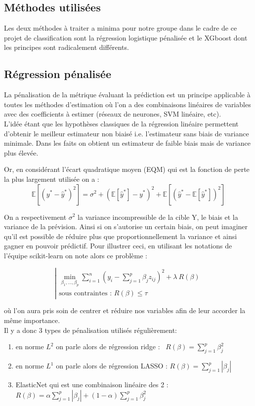 \documentclass[french]{article}
\begin{document}
\begin{multicols}{2}
\section{Méthodes utilisées}
Les deux méthodes à traiter a minima pour notre groupe dans le cadre de ce projet de classification sont la régression logistique pénalisée et le XGboost dont les principes sont radicalement différents.


\subsection{Régression pénalisée}
La pénalisation de la métrique évaluant la prédiction est un principe applicable à toutes les méthodes d'estimation où l’on a des combinaisons linéaires de variables avec des coefficients à estimer (réseaux de neurones, SVM linéaire, etc).\\
L'idée étant que les hypothèses classiques de la régression linéaire permettent d'obtenir le meilleur estimateur non biaisé i.e. l'estimateur sans biais de variance minimale. Dans les faits on obtient un estimateur de faible biais mais de variance plus élevée.

Or, en considérant l'écart quadratique moyen (EQM) qui est la fonction de perte la plus largement utilisée on a : 
\[\mathbb{E}\left[\left(y^{*}-\hat{y}^{*}\right)^{2}\right]=\sigma^{2}+\left(\mathbb{E}\left[\hat{y}^{*}\right]-y^{*}\right)^{2}+\mathbb{E}\left[\left(\hat{y}^{*}-\mathbb{E}\left[\hat{y}^{*}\right]\right)^{2}\right] \]

On a respectivement $\sigma^{2}$ la variance incompressible de la cible Y, le biais et la variance de la prévision. Ainsi si on s'autorise un certain biais, on peut imaginer qu'il est possible de réduire plus que proportionnellement la variance et ainsi gagner en pouvoir prédictif. Pour illustrer ceci, en utilisant les notations de l'équipe scikit-learn on note alors ce problème : 

\[ \left| \begin{array}{l}\displaystyle\min_{\beta_1, \dots, \beta_p} \sum_{i=1}^{n} \left( y_i - \sum_{j=1}^{p}\beta_j z_{ij} \right)^2 + \lambda \ R(\beta) \\
\text{sous contraintes : } R (\beta) \leq \tau \end{array} \right.\]


où l'on aura pris soin de centrer et réduire nos variables afin de leur accorder la même importance.
\\

Il y a donc 3 types de pénalisation utilisés régulièrement: 
\begin{enumerate}
    \item en norme $L^{2}$ on parle alors de régression ridge  : \ $R(\beta)=\sum_{j=1}^{p}\beta_{j}^{2}$
    \item en norme $L^{1}$ on parle alors de régression LASSO  : $R(\beta)=\sum_{j=1}^{p}\left|\beta_{j}\right|$
    \item ElasticNet qui est une combinaison linéaire des 2 : $R(\beta)=\alpha \sum_{j=1}^{p}\left|\beta_{j}\right|+(1-\alpha) \sum_{j=1}^{p} \beta_{j}^{2}$
\end{enumerate}


\end{multicols}
\end{document}
